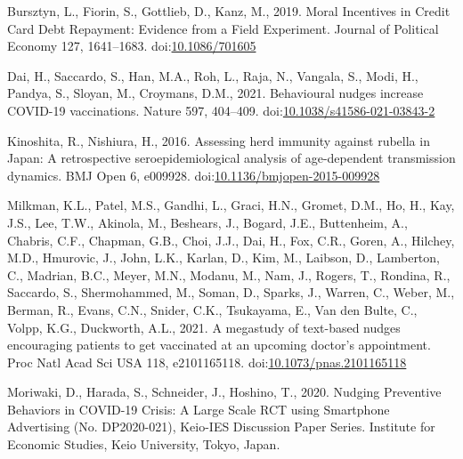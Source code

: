 \documentclass[
  11pt,
  a4paper,
]{article}
\newlength{\cslhangindent}
\newlength{\cslentryspacingunit} %
\newenvironment{CSLReferences}[2] %
 {%
  \setlength{\parindent}{0pt}
  \ifodd #1
  \let\oldpar\par
  \def\par{\hangindent=\cslhangindent\oldpar}
  \fi
  \setlength{\parskip}{#2\cslentryspacingunit}
 }%
 {}
\begin{document}
\hypertarget{refs}{}
\begin{CSLReferences}{1}{0}
\leavevmode{}%
Bursztyn, L., Fiorin, S., Gottlieb, D., Kanz, M., 2019. Moral {Incentives} in {Credit Card Debt Repayment}: {Evidence} from a {Field Experiment}. Journal of Political Economy 127, 1641--1683. doi:\href{https://doi.org/10.1086/701605}{10.1086/701605}

\leavevmode{}%
Dai, H., Saccardo, S., Han, M.A., Roh, L., Raja, N., Vangala, S., Modi, H., Pandya, S., Sloyan, M., Croymans, D.M., 2021. Behavioural nudges increase {COVID-19} vaccinations. Nature 597, 404--409. doi:\href{https://doi.org/10.1038/s41586-021-03843-2}{10.1038/s41586-021-03843-2}

\leavevmode{}%
Kinoshita, R., Nishiura, H., 2016. Assessing herd immunity against rubella in {Japan}: A retrospective seroepidemiological analysis of age-dependent transmission dynamics. BMJ Open 6, e009928. doi:\href{https://doi.org/10.1136/bmjopen-2015-009928}{10.1136/bmjopen-2015-009928}

\leavevmode{}%
Milkman, K.L., Patel, M.S., Gandhi, L., Graci, H.N., Gromet, D.M., Ho, H., Kay, J.S., Lee, T.W., Akinola, M., Beshears, J., Bogard, J.E., Buttenheim, A., Chabris, C.F., Chapman, G.B., Choi, J.J., Dai, H., Fox, C.R., Goren, A., Hilchey, M.D., Hmurovic, J., John, L.K., Karlan, D., Kim, M., Laibson, D., Lamberton, C., Madrian, B.C., Meyer, M.N., Modanu, M., Nam, J., Rogers, T., Rondina, R., Saccardo, S., Shermohammed, M., Soman, D., Sparks, J., Warren, C., Weber, M., Berman, R., Evans, C.N., Snider, C.K., Tsukayama, E., Van den Bulte, C., Volpp, K.G., Duckworth, A.L., 2021. A megastudy of text-based nudges encouraging patients to get vaccinated at an upcoming doctor's appointment. Proc Natl Acad Sci USA 118, e2101165118. doi:\href{https://doi.org/10.1073/pnas.2101165118}{10.1073/pnas.2101165118}

\leavevmode{}%
Moriwaki, D., Harada, S., Schneider, J., Hoshino, T., 2020. Nudging Preventive Behaviors in COVID-19 Crisis: A Large Scale RCT using Smartphone Advertising (No. DP2020-021), Keio-IES Discussion Paper Series. {Institute for Economic Studies, Keio University}, {Tokyo, Japan}.

\end{CSLReferences}
\end{document}
